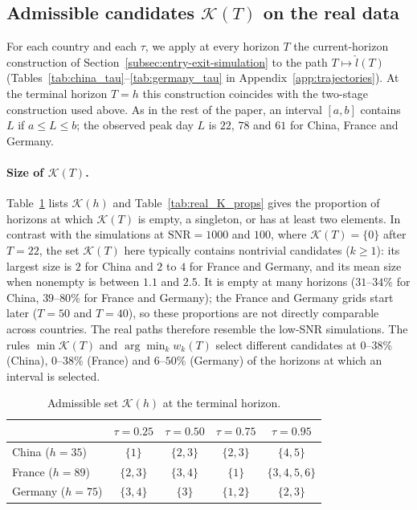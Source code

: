 \documentclass[12pt,a4paper]{article}
\begin{document}
\subsection{Admissible candidates $\mathcal K(T)$ on the real data}
\label{subsec:real-K}

For each country and each $\tau$, we apply at every horizon $T$ the
current-horizon construction of Section~\ref{subsec:entry-exit-simulation}
to the path $T\mapsto\hat l(T)$ (Tables~\ref{tab:china_tau}--\ref{tab:germany_tau} in Appendix~\ref{app:trajectories}).
At the terminal horizon $T=h$ this construction coincides with the
two-stage construction used above. As in the rest of the paper, an
interval $[a,b]$ contains $L$ if $a\le L\le b$; the observed peak day $L$
is $22$, $78$ and $61$ for China, France and Germany.

\paragraph{Size of $\mathcal K(T)$.}
Table~\ref{tab:real_K_terminal} lists $\mathcal K(h)$ and
Table~\ref{tab:real_K_props} gives the proportion of horizons at which
$\mathcal K(T)$ is empty, a singleton, or has at least two elements.
In contrast with the simulations at $\mathrm{SNR}=1000$ and $100$, where
$\mathcal K(T)=\{0\}$ after $T=22$, the set $\mathcal K(T)$ here
typically contains nontrivial candidates ($k\ge1$): its largest size is
$2$ for China and $2$ to $4$ for France and Germany, and its mean size
when nonempty is between $1.1$ and $2.5$. It is empty at many horizons
($31$--$34\%$ for China, $39$--$80\%$ for France and Germany); the
France and Germany grids start later ($T=50$ and $T=40$), so these
proportions are not directly comparable across countries. The real
paths therefore resemble the low-SNR simulations. The rules $\min\mathcal K(T)$
and $\arg\min_k w_k(T)$ select different candidates at
$0$--$38\%$ (China), $0$--$38\%$ (France) and $6$--$50\%$ (Germany) of the
horizons at which an interval is selected.

\begin{table}[htbp]
	\centering
	\small
	\caption{Admissible set $\mathcal K(h)$ at the terminal horizon.}
	\label{tab:real_K_terminal}
	\begin{tabular}{lcccc}
		\toprule
		& $\tau=0.25$ & $\tau=0.50$ & $\tau=0.75$ & $\tau=0.95$ \\
		\midrule
		China ($h=35$)   & $\{1\}$   & $\{2,3\}$ & $\{2,3\}$ & $\{4,5\}$ \\
		France ($h=89$)  & $\{2,3\}$ & $\{3,4\}$ & $\{1\}$   & $\{3,4,5,6\}$ \\
		Germany ($h=75$) & $\{3,4\}$ & $\{3\}$   & $\{1,2\}$ & $\{2,3\}$ \\
		\bottomrule
	\end{tabular}
\end{table}
\end{document}
